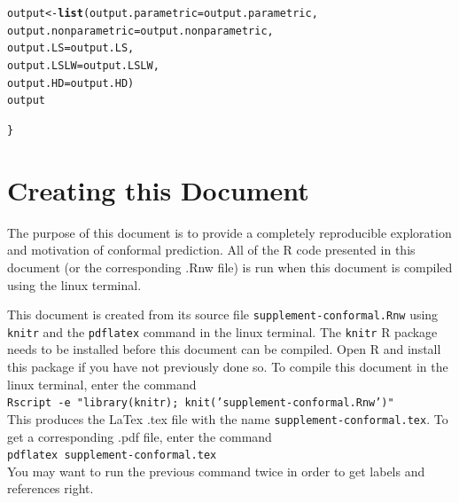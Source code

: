 \documentclass[11pt]{article}\usepackage[]{graphicx}\usepackage[]{color}
\makeatletter
\newcommand{\hlstd}[1]{\textcolor[rgb]{0.345,0.345,0.345}{#1}}%
\newcommand{\hlkwb}[1]{\textcolor[rgb]{0.69,0.353,0.396}{#1}}%
\newcommand{\hlkwc}[1]{\textcolor[rgb]{0.333,0.667,0.333}{#1}}%
\newcommand{\hlkwd}[1]{\textcolor[rgb]{0.737,0.353,0.396}{\textbf{#1}}}%
\newenvironment{kframe}{%
 \def\at@end@of@kframe{}%
 \ifinner\ifhmode%
  \def\at@end@of@kframe{\end{minipage}}%
  \begin{minipage}{\columnwidth}%
 \fi\fi%
 \def\FrameCommand##1{\hskip\@totalleftmargin \hskip-\fboxsep
 \colorbox{shadecolor}{##1}\hskip-\fboxsep
     \hskip-\linewidth \hskip-\@totalleftmargin \hskip\columnwidth}%
 \MakeFramed {\advance\hsize-\width
   \@totalleftmargin\z@ \linewidth\hsize
   \@setminipage}}%
 {\par\unskip\endMakeFramed%
 \at@end@of@kframe}
\newenvironment{knitrout}{}{} %
\makeatother
\begin{document}
\begin{knitrout}
\begin{kframe}
\begin{alltt}
  \hlstd{output} \hlkwb{<-} \hlkwd{list}\hlstd{(}\hlkwc{output.parametric} \hlstd{= output.parametric,}
    \hlkwc{output.nonparametric} \hlstd{= output.nonparametric,}
    \hlkwc{output.LS} \hlstd{= output.LS,}
    \hlkwc{output.LSLW} \hlstd{= output.LSLW,}
    \hlkwc{output.HD} \hlstd{= output.HD)}
  \hlstd{output}

\hlstd{\}}
\end{alltt}
\end{kframe}
\end{knitrout}




















\section{Creating this Document}
The purpose of this document is to provide a completely reproducible 
exploration and motivation of conformal prediction. All of the R code 
presented in this document (or the corresponding .Rnw file) is run when 
this document is compiled using the linux terminal.

This document is created from its source file 
\texttt{supplement-conformal.Rnw} using \texttt{knitr} and the 
\texttt{pdflatex} command in the linux terminal. The \texttt{knitr} R package 
needs to be installed before this document can be compiled. Open R and install 
this package if you have not previously done so. To compile this document in 
the linux terminal, enter the command 
\vspace{0.25cm}\\
\texttt{Rscript -e "library(knitr); knit('supplement-conformal.Rnw')"} 
\vspace{0.25cm}\\
This produces the LaTex .tex file with the name 
\texttt{supplement-conformal.tex}. To get a corresponding .pdf file, enter 
the command
\vspace{0.25cm}\\
\texttt{pdflatex supplement-conformal.tex} 
\vspace{0.25cm}\\
You may want to run the previous command twice in order to get labels and 
references right.




\end{document}
